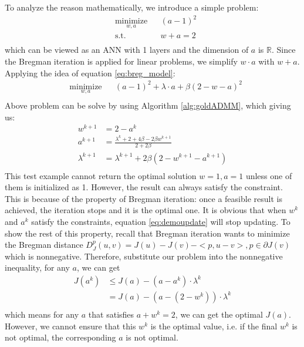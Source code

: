 \documentclass[letterpaper, 10 pt, conference]{ieeeconf}  %
\begin{document}
To analyze the reason mathematically, we introduce a simple problem:
\begin{equation}
\begin{aligned}
& \underset{w,a}{\text{minimize}}  & & (a-1)^2 \\
& \text{s.t.} & & w+a =2\\
\end{aligned}
\label{eq:demo}
\end{equation}
which can be viewed as an ANN with 1 layers and the dimension of $a$ is $\mathbb{R}$. Since the Bregman iteration is applied for linear problems, we simplify $w \cdot a$ with $w + a$. Applying the idea of equation \eqref{eq:breg_model}:
\begin{equation}
\begin{aligned}
& \underset{w,a}{\text{minimize}}  & & (a-1)^2 + \lambda \cdot a + \beta (2-w-a)^2\\
\end{aligned}
\end{equation}
Above problem can be solve by using Algorithm \ref{alg:goldADMM}, which giving us:
\begin{equation}
\begin{aligned}
w^{k+1} &= 2-a^k \\
a^{k+1} &= \frac{\lambda^k+2+4\beta-2\beta w^{k+1}}{2+2\beta}\\
\lambda^{k+1} &= \lambda^{k+1} + 2\beta(2-w^{k+1}-a^{k+1})\\
\end{aligned}
\label{eq:demoupdate}
\end{equation}
This test example cannot return the optimal solution $w=1,a=1$ unless one of them is initialized as 1. However, the result can always satisfy the constraint. This is because of the property of Bregman iteration: once a feasible result is achieved, the iteration stops and it is the optimal one. It is obvious that when $w^k$ and $a^k$ satisfy the constraints, equation \eqref{eq:demoupdate} will stop updating. To show the rest of this property, recall that Bregman iteration wants to minimize the Bregman distance $D^p_J(u,v) = J(u)-J(v)-<p,u-v>, p \in \partial J(v)$ which is nonnegative. Therefore, substitute our problem into the nonnegative inequality, for any $a$, we can get
\begin{equation}
\begin{aligned}
J(a^k) & \leq J(a) -(a-a^k) \cdot \lambda^k \\
& = J(a) - (a-(2-w^k)) \cdot \lambda^k \\
\end{aligned}
\end{equation}
which means for any $a$ that satisfies $a+w^k=2$, we can get the optimal $J(a)$. However, we cannot ensure that this $w^k$ is the optimal value, i.e. if the final $w^k$ is not optimal, the corresponding $a$ is not optimal.
\end{document}
